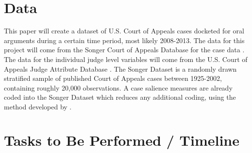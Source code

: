 \documentclass[12pt]{article}
\begin{document}
\section*{Data}
This paper will create a dataset of U.S. Court of Appeals cases docketed for oral arguments during a certain time period, most likely 2008-2013.  The data for this project will come from the Songer Court of Appeals Database for the case data \citep{Songer2007}.  The data for the individual judge level variables will come from the U.S. Court of Appeals Judge Attribute Database \citep{Gryski2008}.  The Songer Dataset is a randomly drawn stratified sample of published Court of Appeals cases between 1925-2002, containing roughly 20,000 observations. A case salience measures are already coded into the Songer Dataset which reduces any additional coding, using the method developed by \citet{Hettinger2003}.

\section*{Tasks to Be Performed / Timeline}


\singlespacing


\end{document}
